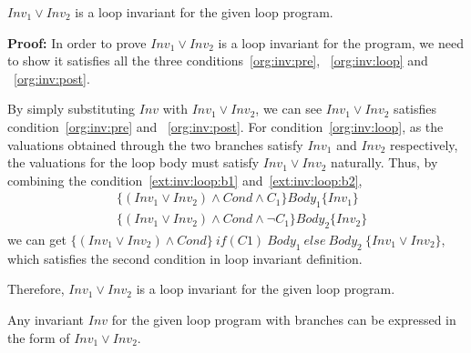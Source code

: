 
\begin{theorem}
\label{thm:disjunctive:is:invariant}
	$Inv_1 \vee Inv_2$ is a loop invariant for the given loop program.
\end{theorem}

\noindent \textbf{Proof:} In order to prove $Inv_1 \vee Inv_2$ is a loop invariant for the program,
we need to show it satisfies all the three conditions~\ref{org:inv:pre}, ~\ref{org:inv:loop} and ~\ref{org:inv:post}.

By simply substituting $Inv$ with  $Inv_1 \vee Inv_2$,
we can see $Inv_1 \vee Inv_2$ satisfies condition~\ref{org:inv:pre} and ~\ref{org:inv:post}.
For condition~\ref{org:inv:loop},
as the valuations obtained through the two branches satisfy $Inv_1$ and $Inv_2$ respectively,
the valuations for the loop body must satisfy $Inv_1 \vee Inv_2$ naturally.
Thus, by combining the condition~\ref{ext:inv:loop:b1} and~\ref{ext:inv:loop:b2},
\begin{align*}
&\{(Inv_1 \vee Inv_2) \wedge Cond \wedge C_1\} Body_1 \{Inv_1\} \\
&\{(Inv_1 \vee Inv_2) \wedge Cond \wedge \neg C_1\} Body_2 \{Inv_2\}
\end{align*}
we can get $\{(Inv_1 \vee Inv_2) \wedge Cond\}~if (C1)~{Body_1}~else~{Body_2}~\{Inv_1 \vee Inv_2\}$,
which satisfies the second condition in loop invariant definition.

Therefore, $Inv_1 \vee Inv_2$ is a loop invariant for the given loop program. %

\begin{theorem}
\label{thm:invariant:is:disjunctive}
	Any invariant $Inv$ for the given loop program with branches can be expressed in the form of $Inv_1 \vee Inv_2$.
\end{theorem}

